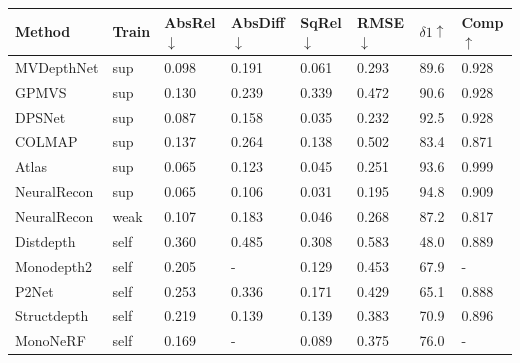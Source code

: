 \iffalse
\begin{table}[]
\setlength\tabcolsep{1pt}
\footnotesize
\begin{tabular}{llllllll}
\hline
Method         & Train        & AbsRel$\downarrow$ & AbsDiff$\downarrow$ & SqRel$\downarrow$ & RMSE$\downarrow$  & \textbf{$\delta1\uparrow$}  & Comp$\uparrow$  \\ \hline
MVDepthNet\cite{mvdepthnet}     & sup         & 0.098   & 0.191    & 0.061  & 0.293 & 89.6 &  0.928 \\
GPMVS\cite{gpmvs}          & sup          & 0.130   & 0.239    & 0.339  & 0.472 & 90.6 & 0.928 \\
DPSNet\cite{dpsnet}         & sup          & 0.087   & 0.158    & 0.035  & 0.232 & 92.5 & 0.928 \\
COLMAP\cite{colmap}         & sup          & 0.137   & 0.264    & 0.138  & 0.502 & 83.4 & 0.871 \\
Atlas\cite{atlas}          & sup          & 0.065   & 0.123    & 0.045  & 0.251 & 93.6 & 0.999 \\
NeuralRecon\cite{neucon}    & sup          & 0.065   & 0.106    & 0.031  & 0.195 & 94.8 & 0.909 \\
NeuralRecon\cite{neucon}    & weak         & 0.107   & 0.183    & 0.046  & 0.268 & 87.2 & 0.817 \\
\hline
Distdepth\cite{distdepth}   & self      & 0.360   & 0.485    & 0.308  & 0.583 & 48.0 & 0.889 \\
Monodepth2\cite{monodepth2}   & self      & 0.205   & -    & 0.129  & 0.453 & 67.9 & - \\
P2Net\cite{p2net}   & self               & 0.253   & 0.336    & 0.171  & 0.429 & 65.1 & 0.888 \\
Structdepth\cite{structdepth}   & self      & 0.219   & 0.139    & 0.139  & 0.383 & 70.9 & 0.896 \\
MonoNeRF\cite{mononerf}   & self         & 0.169   & -    & 0.089  & 0.375 & 76.0 & - \\

\end{tabular}
\end{table}
